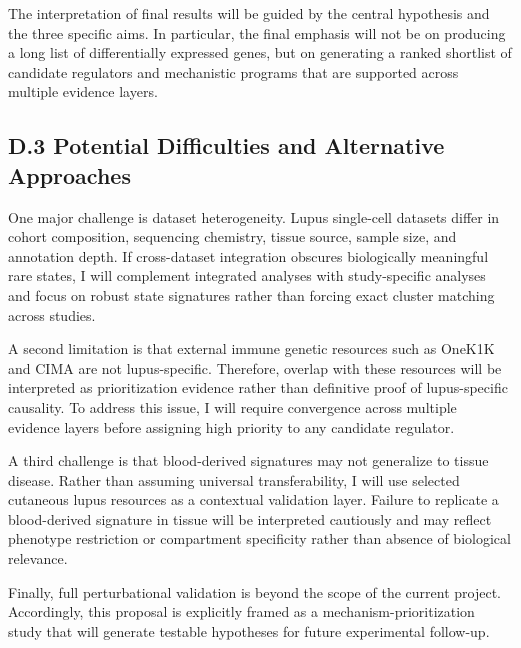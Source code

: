 \documentclass[12pt, a4paper]{article}
\begin{document}
The interpretation of final results will be guided by the central hypothesis and the three specific aims. In particular, the final emphasis will not be on producing a long list of differentially expressed genes, but on generating a ranked shortlist of candidate regulators and mechanistic programs that are supported across multiple evidence layers.

\subsection*{D.3 Potential Difficulties and Alternative Approaches}

One major challenge is dataset heterogeneity. Lupus single-cell datasets differ in cohort composition, sequencing chemistry, tissue source, sample size, and annotation depth. If cross-dataset integration obscures biologically meaningful rare states, I will complement integrated analyses with study-specific analyses and focus on robust state signatures rather than forcing exact cluster matching across studies.

A second limitation is that external immune genetic resources such as OneK1K and CIMA are not lupus-specific. Therefore, overlap with these resources will be interpreted as prioritization evidence rather than definitive proof of lupus-specific causality. To address this issue, I will require convergence across multiple evidence layers before assigning high priority to any candidate regulator.

A third challenge is that blood-derived signatures may not generalize to tissue disease. Rather than assuming universal transferability, I will use selected cutaneous lupus resources as a contextual validation layer. Failure to replicate a blood-derived signature in tissue will be interpreted cautiously and may reflect phenotype restriction or compartment specificity rather than absence of biological relevance.

Finally, full perturbational validation is beyond the scope of the current project. Accordingly, this proposal is explicitly framed as a mechanism-prioritization study that will generate testable hypotheses for future experimental follow-up.
\end{document}
